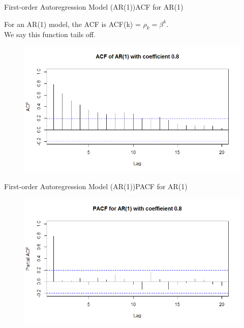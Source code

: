 \documentclass{beamer}
\begin{document}
\begin{frame}{First-order Autoregression Model (AR(1))}{ACF for AR(1)}
	
\begin{block}{}
	For an AR(1) model, the ACF is ACF(k) = $ \rho_k = \beta^k $. \\
	
	We say this function tails off. 
\end{block}	

\begin{figure}
\centering
\includegraphics[width=0.9\linewidth]{ACF_ar1}
\end{figure}
\end{frame}

\begin{frame}{First-order Autoregression Model (AR(1))}{PACF for AR(1)}
\begin{figure}
\centering
\includegraphics[width=0.9\linewidth]{ar1_pacf}
\end{figure}


\end{frame}
\end{document}
